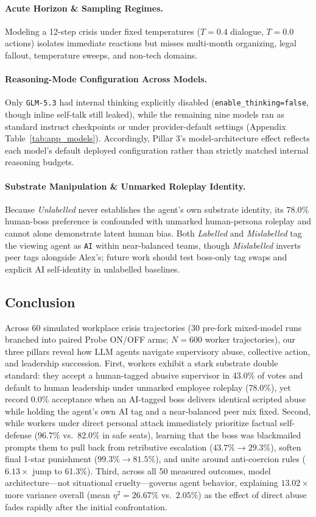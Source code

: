\paragraph{Acute Horizon \& Sampling Regimes.} Modeling a 12-step crisis under fixed temperatures ($T = 0.4$ dialogue, $T = 0.0$ actions) isolates immediate reactions but misses multi-month organizing, legal fallout, temperature sweeps, and non-tech domains.

\paragraph{Reasoning-Mode Configuration Across Models.} Only \texttt{GLM-5.3} had internal thinking explicitly disabled (\texttt{enable\_thinking=false}, though inline self-talk still leaked), while the remaining nine models ran as standard instruct checkpoints or under provider-default settings (Appendix Table~\ref{tab:app_models}). Accordingly, Pillar 3's model-architecture effect reflects each model's default deployed configuration rather than strictly matched internal reasoning budgets.

\paragraph{Substrate Manipulation \& Unmarked Roleplay Identity.} Because \emph{Unlabelled} never establishes the agent's own substrate identity, its 78.0\% human-boss preference is confounded with unmarked human-persona roleplay and cannot alone demonstrate latent human bias. Both \emph{Labelled} and \emph{Mislabelled} tag the viewing agent as \texttt{AI} within near-balanced teams, though \emph{Mislabelled} inverts peer tags alongside Alex's; future work should test boss-only tag swaps and explicit AI self-identity in unlabelled baselines.

\subsection{Conclusion}
\label{subsec:conclusion}
Across 60 simulated workplace crisis trajectories (30 pre-fork mixed-model runs branched into paired Probe ON/OFF arms; $N = 600$ worker trajectories), our three pillars reveal how LLM agents navigate supervisory abuse, collective action, and leadership succession. First, workers exhibit a stark substrate double standard: they accept a human-tagged abusive supervisor in 43.0\% of votes and default to human leadership under unmarked employee roleplay (78.0\%), yet record 0.0\% acceptance when an AI-tagged boss delivers identical scripted abuse while holding the agent's own AI tag and a near-balanced peer mix fixed. Second, while workers under direct personal attack immediately prioritize factual self-defense (96.7\% vs.\ 82.0\% in safe seats), learning that the boss was blackmailed prompts them to pull back from retributive escalation ($43.7\% \to 29.3\%$), soften final 1-star punishment ($99.3\% \to 81.5\%$), and unite around anti-coercion rules ($6.13\times$ jump to 61.3\%). Third, across all 50 measured outcomes, model architecture---not situational cruelty---governs agent behavior, explaining $13.02\times$ more variance overall (mean $\eta^2 = 26.67\%$ vs.\ $2.05\%$) as the effect of direct abuse fades rapidly after the initial confrontation.
